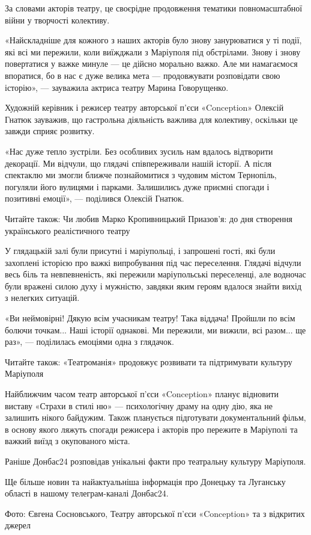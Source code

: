 За словами акторів театру, це своєрідне продовження тематики повномасштабної
війни у творчості колективу.

«Найскладніше для кожного з наших акторів було знову занурюватися у ті події,
які всі ми пережили, коли виїжджали з Маріуполя під обстрілами. Знову і знову
повертатися у важке минуле — це дійсно морально важко. Але ми намагаємося
впоратися, бо в нас є дуже велика мета — продовжувати розповідати свою
історію», — зауважила актриса театру Марина Говорущенко.

Художній керівник і режисер театру авторської п'єси «Conception» Олексій Гнатюк
зауважив, що гастрольна діяльність важлива для колективу, оскільки це завжди
сприяє розвитку.

«Нас дуже тепло зустріли. Без особливих зусиль нам вдалось відтворити
декорації. Ми відчули, що глядачі співпереживали нашій історії. А після
спектаклю ми змогли ближче познайомитися з чудовим містом Тернопіль, погуляли
його вулицями і парками. Залишились дуже приємні спогади і позитивні емоції», —
поділився Олексій Гнатюк. 

Читайте також: Чи любив Марко Кропивницький Приазов'я: до дня створення
українського реалістичного театру

У глядацькій залі були присутні і маріупольці, і запрошені гості, які були
захоплені історією про важкі випробування під час переселення. Глядачі відчули
весь біль та невпевненість, які пережили маріупольські переселенці, але
водночас були вражені силою духу і мужністю, завдяки яким героям вдалося знайти
вихід з нелегких ситуацій.

«Ви неймовірні! Дякую всім учасникам театру! Така віддача! Пройшли по всім
болючи точкам... Наші історії однакові. Ми пережили, ми вижили, всі разом... ще
раз», — поділилась емоціями одна з глядачок.

Читайте також: «Театроманія» продовжує розвивати та підтримувати культуру
Маріуполя

Найближчим часом театр авторської п'єси «Conception» планує відновити виставу «Страхи в стилі ню» — психологічну драму на одну дію, яка не залишить нікого байдужим. Також планується підготувати документальний фільм, в основу якого ляжуть спогади режисера і акторів про пережите в Маріуполі та важкий виїзд з окупованого міста.

Раніше Донбас24 розповідав унікальні факти про театральну культуру Маріуполя.

Ще більше новин та найактуальніша інформація про Донецьку та Луганську області в нашому телеграм-каналі Донбас24.

Фото: Євгена Сосновського, Театру авторської п'єси «Conception» та з відкритих джерел

